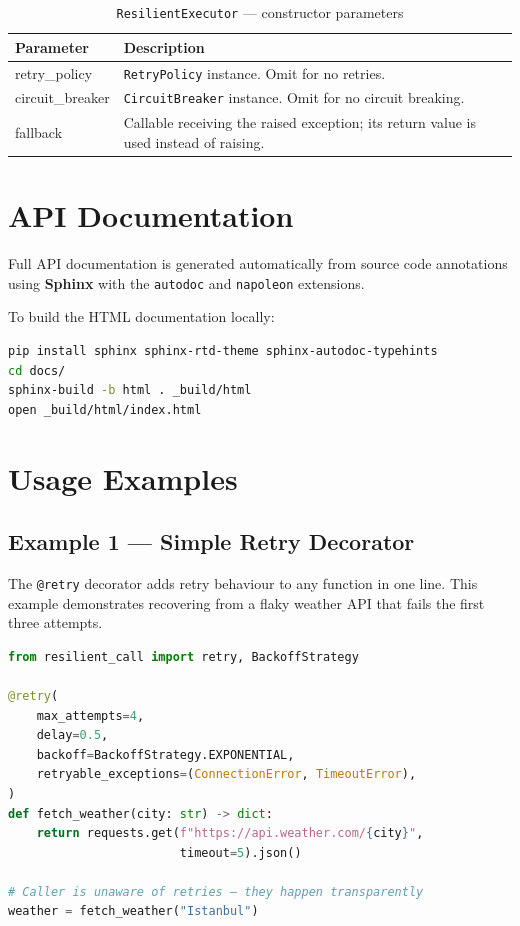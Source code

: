 \begin{table}[H]
    \centering
    \caption{\texttt{ResilientExecutor} — constructor parameters}
    \begin{tabularx}{\linewidth}{>{\ttfamily}l X}
        \toprule
        Parameter & Description \\
        \midrule
        retry\_policy   & \texttt{RetryPolicy} instance.  Omit for no retries. \\
        circuit\_breaker & \texttt{CircuitBreaker} instance.  Omit for no circuit breaking. \\
        fallback        & Callable receiving the raised exception; its return value is used instead of raising. \\
        \bottomrule
    \end{tabularx}
\end{table}

\section{API Documentation}
\label{sec:api-docs}

Full API documentation is generated automatically from source code annotations
using \textbf{Sphinx} with the \texttt{autodoc} and \texttt{napoleon} extensions.

To build the HTML documentation locally:

\begin{lstlisting}[language=bash, numbers=none, frame=none, backgroundcolor=\color{backcolour}]
pip install sphinx sphinx-rtd-theme sphinx-autodoc-typehints
cd docs/
sphinx-build -b html . _build/html
open _build/html/index.html
\end{lstlisting}

\section{Usage Examples}
\label{sec:usage-examples}

\subsection{Example 1 — Simple Retry Decorator}

The \texttt{@retry} decorator adds retry behaviour to any function in one line.
This example demonstrates recovering from a flaky weather API that fails
the first three attempts.

\begin{lstlisting}[language=Python, caption={Retry decorator — exponential backoff}, label={lst:retry-decorator}]
from resilient_call import retry, BackoffStrategy

@retry(
    max_attempts=4,
    delay=0.5,
    backoff=BackoffStrategy.EXPONENTIAL,
    retryable_exceptions=(ConnectionError, TimeoutError),
)
def fetch_weather(city: str) -> dict:
    return requests.get(f"https://api.weather.com/{city}",
                        timeout=5).json()

# Caller is unaware of retries — they happen transparently
weather = fetch_weather("Istanbul")
\end{lstlisting}


